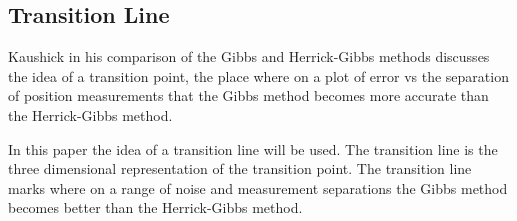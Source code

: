\documentclass[12pt]{article}
\begin{document}
		\subsection{Transition Line}
		Kaushick \cite{Kaushick} in his comparison of the Gibbs and Herrick-Gibbs methods discusses the idea of a transition point, the place where on a plot of error vs the separation of position measurements that the Gibbs method becomes more accurate than the Herrick-Gibbs method.\par 
		In this paper the idea of a transition line will be used. The transition line is the three dimensional representation of the transition point. The transition line marks where on a range of noise and measurement separations the Gibbs method becomes better than the Herrick-Gibbs method.
		
		
		

\end{document}
